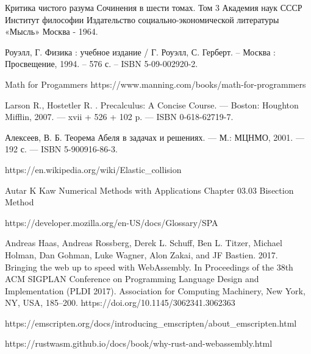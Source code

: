 \begingroup
\renewcommand{\section}[2]{\Anonchapter{Список использованных источников}\vspace{-1em}}
\begin{thebibliography}{00}

    Критика чистого разума
    Сочинения в шести томах.
    Том 3
    Академия наук СССР
    Институт философии
    Издательство социально-экономической литературы
    «Мысль»
    Москва - 1964. \TODO

    Роуэлл, Г. Физика : учебное издание / Г. Роуэлл, С. Герберт. -- Москва : Просвещение, 1994. -- 576 с. -- ISBN 5-09-002920-2.

    Math for Progammers \TODO
    https://www.manning.com/books/math-for-programmers

    Larson R., Hostetler R. . Precalculus: A Concise Course. — Boston:
    Houghton Mifflin, 2007. — xvii + 526 + 102 p. — ISBN 0-618-62719-7. \TODO

    Алексеев, В. Б. Теорема Абеля в задачах и решениях. — М.: МЦНМО, 2001. — 192 с. — ISBN 5-900916-86-3. \TODO

    https://en.wikipedia.org/wiki/Elastic\_collision \TODO

    \TODO Autar K Kaw Numerical Methods with Applications Chapter 03.03 Bisection Method

    https://developer.mozilla.org/en-US/docs/Glossary/SPA \TODO

    Andreas Haas, Andreas Rossberg, Derek L. Schuff, Ben L. Titzer, Michael Holman, Dan Gohman, Luke Wagner, Alon Zakai, and JF Bastien.
    2017. Bringing the web up to speed with WebAssembly.
    In Proceedings of the 38th ACM SIGPLAN Conference on Programming Language Design and Implementation (PLDI 2017).
    Association for Computing Machinery, New York, NY, USA, 185–200. https://doi.org/10.1145/3062341.3062363 \TODO

    https://emscripten.org/docs/introducing\_emscripten/about\_emscripten.html \TODO

    https://rustwasm.github.io/docs/book/why-rust-and-webassembly.html \TODO


\end{thebibliography}
